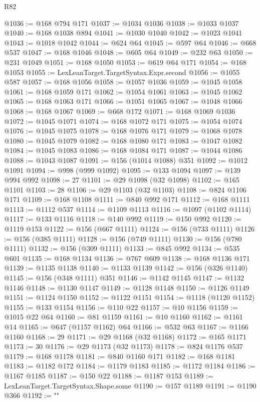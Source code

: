 \begin{lexlean}{R82}
\begin{coremodule}
@1036 := @168 @794 @171
@1037 := @1034 @1036
@1038 := @1033 @1037
@1040 := @168 @1038 @894
@1041 := @1030 @1040
@1042 := @1023 @1041
@1043 := @1018 @1042
@1044 := @624 @64
@1045 := @597 @64
@1046 := @668 @537
@1047 := @168 @1046
@1048 := @605 @64
@1049 := @232 @63
@1050 := @231 @1049
@1051 := @168 @1050
@1053 := @619 @64 @171
@1054 := @168 @1053
@1055 := LexLeanTarget.TargetSyntax.Expr.second
@1056 := @1055 @587
@1057 := @168 @1056
@1058 := @1057 @1036
@1059 := @1045 @1058
@1061 := @168 @1059 @171
@1062 := @1054 @1061
@1063 := @1045 @1062
@1065 := @168 @1063 @171
@1066 := @1051 @1065
@1067 := @1048 @1066
@1068 := @168 @1067
@1069 := @668 @172
@1071 := @168 @1069 @1036
@1072 := @1045 @1071
@1074 := @168 @1072 @171
@1075 := @1054 @1074
@1076 := @1045 @1075
@1078 := @168 @1076 @171
@1079 := @1068 @1078
@1080 := @1045 @1079
@1082 := @168 @1080 @171
@1083 := @1047 @1082
@1084 := @1045 @1083
@1086 := @168 @1084 @171
@1087 := @1044 @1086
@1088 := @1043 @1087
@1091 := @156 (@1014 @1088) @351
@1092 := @1012 @1091
@1094 := @998 (@999 @1092)
@1095 := @133 @1094
@1097 := @139 @994 @992
@1098 := 27
@1101 := @29 @1098 (@32 @1098)
@1102 := @165 @1101
@1103 := 28
@1106 := @29 @1103 (@32 @1103)
@1108 := @824 @1106 @171
@1109 := @168 @1108
@1111 := @840 @992 @171
@1112 := @168 @1111
@1113 := @1112 @537
@1114 := @1109 @1113
@1116 := @1097 (@1102 @1114)
@1117 := @133 @1116
@1118 := @140 @992
@1119 := @150 @992
@1120 := @1119 @153
@1122 := @156 (@667 @1111)
@1124 := @156 (@733 @1111)
@1126 := @156 (@385 @1111)
@1128 := @156 (@749 @1111)
@1130 := @156 (@780 @1111)
@1132 := @156 (@309 @1111)
@1133 := @845 @992
@1134 := @535 @601
@1135 := @168 @1134
@1136 := @767 @609
@1138 := @168 @1136 @171
@1139 := @1135 @1138
@1140 := @1133 @1139
@1142 := @156 (@326 @1140)
@1145 := @156 (@348 @1111) @351
@1146 := @1142 @1145
@1147 := @1132 @1146
@1148 := @1130 @1147
@1149 := @1128 @1148
@1150 := @1126 @1149
@1151 := @1124 @1150
@1152 := @1122 @1151
@1154 := @1118 (@1120 @1152)
@1155 := @133 @1154
@1156 := @110 @22
@1157 := @10 @1156
@1159 := @1015 @22 @64
@1160 := @81 @1159
@1161 := @10 @1160
@1162 := @1161 @14
@1165 := @647 (@1157 @1162) @64
@1166 := @532 @63
@1167 := @1166 @1160
@1168 := 29
@1171 := @29 @1168 (@32 @1168)
@1172 := @165 @1171
@1173 := 30
@1176 := @29 @1173 (@32 @1173)
@1178 := @824 @1176 @537
@1179 := @168 @1178
@1181 := @840 @1160 @171
@1182 := @168 @1181
@1183 := @1182 @172
@1184 := @1179 @1183
@1185 := @1172 @1184
@1186 := @1167 @1185
@1187 := @150 @22
@1188 := @1187 @153
@1189 := LexLeanTarget.TargetSyntax.Shape.some
@1190 := @157 @1189
@1191 := @1190 @366
@1192 := "{"
}
\end{coremodule}
\end{lexlean}
